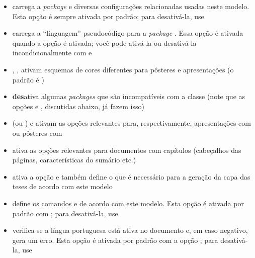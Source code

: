\begin{itemize}
  \item {} carrega a \textit{package}  e diversas
        configurações relacionadas usadas neste modelo. Esta opção é
        sempre ativada por padrão; para desativá-la, use 

  \item {} carrega a ``linguagem'' pseudocódigo para a
        \textit{package} . Essa opção é ativada quando a
        opção  é ativada; você pode ativá-la ou desativá-la
        incondicionalmente com  e 

  \item {}, ,  ativam esquemas de cores
        diferentes para pôsteres e apresentações (o padrão é )

  \item {} \textbf{des}ativa algumas \textit{packages} que
        são incompatíveis com a classe  (note que as opções
         e , discutidas abaixo, já fazem isso)

  \item {} (ou ) e  ativam as
        opções relevantes para, respectivamente, apresentações com
         ou pôsteres com 

  \item {} ativa as opções relevantes para documentos com
        capítulos (cabeçalhos das páginas, características do sumário etc.)

  \item {} ativa a opção  e também define o que é
        necessário para a geração da capa das teses de acordo com este modelo

  \item {} define os comandos  e 
        de acordo com este modelo. Esta opção é ativada por padrão com
        ; para desativá-la, use 

  \item {} verifica se a língua portuguesa está ativa no
        documento e, em caso negativo, gera um erro. Esta opção é
        ativada por padrão com a opção ; para desativá-la,
        use 
\end{itemize}
